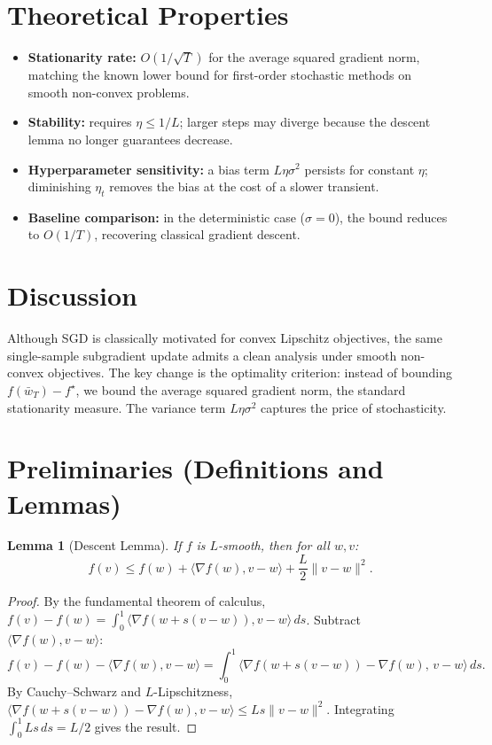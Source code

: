 \documentclass[11pt]{article}
\newtheorem{lemma}{Lemma}
\begin{document}
\section*{Theoretical Properties}
\begin{itemize}
  \item \textbf{Stationarity rate:} $O(1/\sqrt{T})$ for the average squared
        gradient norm, matching the known lower bound for first-order
        stochastic methods on smooth non-convex problems.
  \item \textbf{Stability:} requires $\eta\le1/L$; larger steps may diverge
        because the descent lemma no longer guarantees decrease.
  \item \textbf{Hyperparameter sensitivity:} a bias term $L\eta\sigma^2$
        persists for constant $\eta$; diminishing $\eta_t$ removes the bias
        at the cost of a slower transient.
  \item \textbf{Baseline comparison:} in the deterministic case ($\sigma=0$),
        the bound reduces to $O(1/T)$, recovering classical gradient descent.
\end{itemize}

\section*{Discussion}
Although SGD is classically motivated for convex Lipschitz objectives, the
same single-sample subgradient update admits a clean analysis under smooth
non-convex objectives. The key change is the optimality criterion: instead
of bounding $f(\bar w_T)-f^\star$, we bound the average squared gradient
norm, the standard stationarity measure. The variance term $L\eta\sigma^2$
captures the price of stochasticity.

\section*{Preliminaries (Definitions and Lemmas)}
\begin{lemma}[Descent Lemma]\label{lem:descent}
If $f$ is $L$-smooth, then for all $w,v$:
\[
f(v)\le f(w)+\langle\nabla f(w),v-w\rangle+\frac{L}{2}\|v-w\|^2.
\]
\end{lemma}
\begin{proof}
By the fundamental theorem of calculus,
$f(v)-f(w)=\int_0^1\langle\nabla f(w+s(v-w)),v-w\rangle\,ds$.
Subtract $\langle\nabla f(w),v-w\rangle$:
\[
f(v)-f(w)-\langle\nabla f(w),v-w\rangle
=\int_0^1\langle\nabla f(w+s(v-w))-\nabla f(w),\,v-w\rangle\,ds.
\]
By Cauchy--Schwarz and $L$-Lipschitzness,
$\langle\nabla f(w+s(v-w))-\nabla f(w),v-w\rangle\le Ls\|v-w\|^2$.
Integrating $\int_0^1 Ls\,ds=L/2$ gives the result.
\end{proof}
\end{document}
